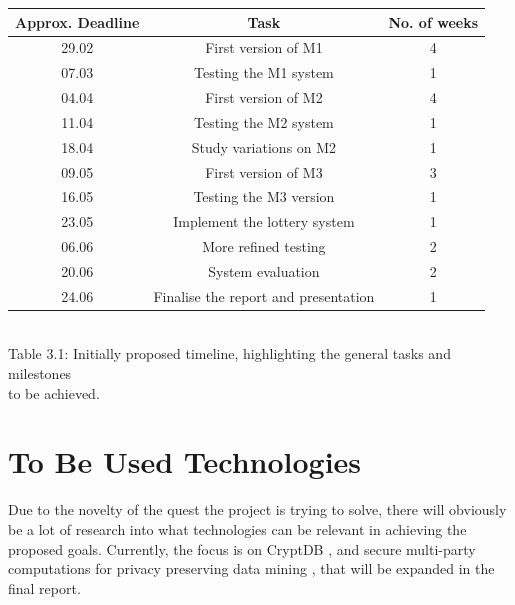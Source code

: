 \begin{center}
  \begin{tabular}{| c | c | c |}
    \hline
    Approx. Deadline & Task & No. of weeks \\ \hline
    29.02 & First version of M1 & 4 \\ 
    07.03 & Testing the M1 system & 1 \\ \hline
    04.04 & First version of M2 & 4 \\
    11.04 & Testing the M2 system & 1 \\
    18.04 & Study variations on M2 & 1 \\ \hline
    09.05 & First version of M3 & 3 \\
    16.05 & Testing the M3 version & 1 \\ \hline
    23.05 & Implement the lottery system & 1 \\ \hline
    06.06 & More refined testing & 2 \\ \hline
    20.06 & System evaluation & 2 \\ 
    24.06 & Finalise the report and presentation & 1 \\
    \hline
  \end{tabular}
\bigskip
\\
Table 3.1: Initially proposed timeline, highlighting the general tasks and milestones \\ to be achieved.
\end{center}
\section{To Be Used Technologies}
Due to the novelty of the quest the project is trying to solve, there will obviously be a lot of research into what technologies can be relevant in achieving the proposed goals. Currently, the focus is on CryptDB \cite{cryptdb}, and secure multi-party computations for privacy preserving data mining \cite{smpc}, that will be expanded in the final report.